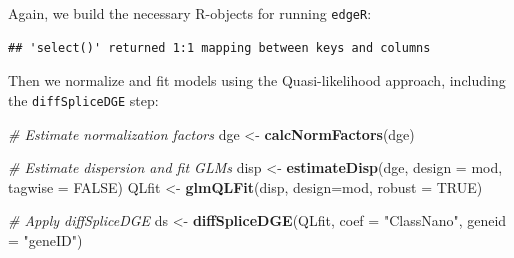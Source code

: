 \documentclass[9pt,a4paper,]{extarticle}
\newenvironment{Shaded}{\begin{snugshade}}{\end{snugshade}}
\newcommand{\KeywordTok}[1]{\textcolor[rgb]{0.13,0.29,0.53}{\textbf{{#1}}}}
\newcommand{\DataTypeTok}[1]{\textcolor[rgb]{0.13,0.29,0.53}{{#1}}}
\newcommand{\StringTok}[1]{\textcolor[rgb]{0.31,0.60,0.02}{{#1}}}
\newcommand{\CommentTok}[1]{\textcolor[rgb]{0.56,0.35,0.01}{\textit{{#1}}}}
\newcommand{\OtherTok}[1]{\textcolor[rgb]{0.56,0.35,0.01}{{#1}}}
\newcommand{\NormalTok}[1]{{#1}}
\begin{document}
Again, we build the necessary R-objects for running \texttt{edgeR}:

\begin{Shaded}
\end{Shaded}

\begin{verbatim}
## 'select()' returned 1:1 mapping between keys and columns
\end{verbatim}

\begin{Shaded}
\end{Shaded}

Then we normalize and fit models using the Quasi-likelihood approach, including the \texttt{diffSpliceDGE} step:

\begin{Shaded}
\begin{Highlighting}[]
\CommentTok{# Estimate normalization factors}
\NormalTok{dge <-}\StringTok{ }\KeywordTok{calcNormFactors}\NormalTok{(dge)}

\CommentTok{# Estimate dispersion and fit GLMs}
\NormalTok{disp <-}\StringTok{ }\KeywordTok{estimateDisp}\NormalTok{(dge, }\DataTypeTok{design =} \NormalTok{mod, }\DataTypeTok{tagwise =} \OtherTok{FALSE}\NormalTok{)}
\NormalTok{QLfit <-}\StringTok{ }\KeywordTok{glmQLFit}\NormalTok{(disp, }\DataTypeTok{design=}\NormalTok{mod, }\DataTypeTok{robust =} \OtherTok{TRUE}\NormalTok{)}

\CommentTok{# Apply diffSpliceDGE}
\NormalTok{ds <-}\StringTok{ }\KeywordTok{diffSpliceDGE}\NormalTok{(QLfit, }\DataTypeTok{coef =} \StringTok{"ClassNano"}\NormalTok{, }\DataTypeTok{geneid =} \StringTok{"geneID"}\NormalTok{)}
\end{Highlighting}
\end{Shaded}
\end{document}
